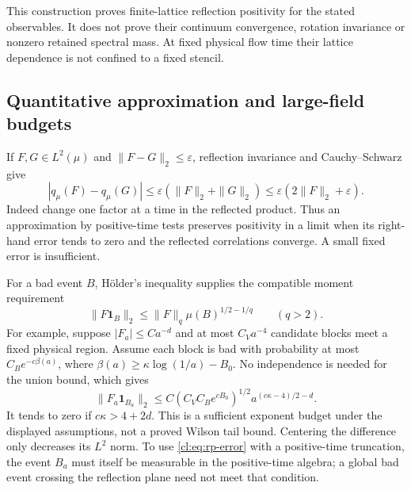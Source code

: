This construction proves finite-lattice reflection positivity for the
stated observables. It does not prove their continuum convergence,
rotation invariance or nonzero retained spectral mass. At fixed physical
flow time their lattice dependence is not confined to a fixed stencil.

\subsection{Quantitative approximation and large-field budgets}
If $F,G\in L^2(\mu)$ and $\|F-G\|_2\le\varepsilon$, reflection
invariance and Cauchy--Schwarz give
\begin{equation}\label{cl:eq:rp-error}
|q_\mu(F)-q_\mu(G)|
\le\varepsilon(\|F\|_2+\|G\|_2)
\le\varepsilon(2\|F\|_2+\varepsilon).
\end{equation}
Indeed change one factor at a time in the reflected product. Thus an
approximation by positive-time tests preserves positivity in a limit
when its right-hand error tends to zero and the reflected correlations
converge. A small fixed error is insufficient.

For a bad event $B$, H\"older's inequality supplies the compatible
moment requirement
\[
\|F\mathbf1_B\|_2\le\|F\|_q\mu(B)^{1/2-1/q}\qquad(q>2).
\]
For example, suppose $|F_a|\le Ca^{-d}$ and at most $C_Va^{-4}$
candidate blocks meet a fixed physical region. Assume each block is
bad with probability at most $C_Be^{-c\beta(a)}$, where
$\beta(a)\ge\kappa\log(1/a)-B_0$. No independence is needed for
the union bound, which gives
\[
\|F_a\mathbf1_{B_a}\|_2
\le C(C_VC_Be^{cB_0})^{1/2}
     a^{(c\kappa-4)/2-d}.
\]
It tends to zero if $c\kappa>4+2d$. This is a sufficient exponent
budget under the displayed assumptions, not a proved Wilson tail bound.
Centering the difference only decreases its $L^2$ norm. To use
\eqref{cl:eq:rp-error} with a positive-time truncation, the event
$B_a$ must itself be measurable in the positive-time algebra; a global
bad event crossing the reflection plane need not meet that condition.
